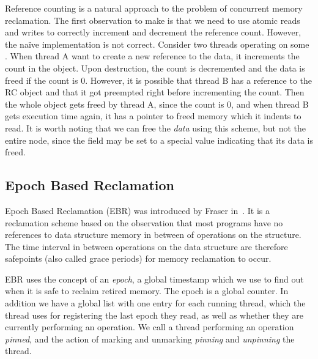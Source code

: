 \documentclass[a4paper,twoside]{article}
\begin{document}
Reference counting is a natural approach to the problem of concurrent memory reclamation.
The first observation to make is that we need to use atomic reads and writes
to correctly increment and decrement the reference count. However,
the na\"ive implementation is not correct.
Consider two threads operating on some .
When thread A want to create a new reference to the data, it increments the count in
the  object. Upon destruction, the count is decremented
and the data is freed if the count is 0.
However, it is possible that thread B has a reference to the RC object
and that it got preempted right before incrementing the count.
Then the whole object gets freed by thread A, since the count is 0,
and when thread B gets execution time again, it has a pointer to freed memory
which it indents to read.
It is worth noting that we can free the \emph{data} using this scheme, but not
the entire  node, since the  field may be set to a special
value indicating that its data is freed.



%

\subsection{Epoch Based Reclamation}
Epoch Based Reclamation (EBR) was introduced by Fraser in~\cite{fraser2004practical}.
It is a reclamation scheme based on the observation that most programs have no
references to data structure memory in between of operations on the structure.
The time interval in between operations on the data structure are therefore
safepoints (also called grace periods) for memory reclamation to occur.

EBR uses the concept of an \emph{epoch}, a global timestamp which we
use to find out when it is safe to reclaim retired memory.
The epoch is a global counter.
In addition we have a global list with one entry for each running thread,
which the thread uses for registering the last epoch they read, as well as
whether they are currently performing an operation.
We call a thread performing an operation \emph{pinned}, and the action of
marking and unmarking \emph{pinning} and \emph{unpinning} the thread.
\end{document}
